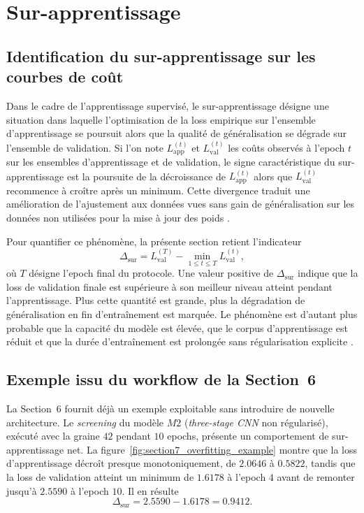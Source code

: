 \section{Sur-apprentissage}

\subsection{Identification du sur-apprentissage sur les courbes de co\^ut}
Dans le cadre de l'apprentissage supervis\'e, le sur-apprentissage d\'esigne une situation dans laquelle l'optimisation de la loss empirique sur l'ensemble d'apprentissage se poursuit alors que la qualit\'e de g\'en\'eralisation se d\'egrade sur l'ensemble de validation. Si l'on note $L_{\mathrm{app}}^{(t)}$ et $L_{\mathrm{val}}^{(t)}$ les co\^uts observ\'es \`a l'epoch $t$ sur les ensembles d'apprentissage et de validation, le signe caract\'eristique du sur-apprentissage est la poursuite de la d\'ecroissance de $L_{\mathrm{app}}^{(t)}$ alors que $L_{\mathrm{val}}^{(t)}$ recommence \`a cro\^itre apr\`es un minimum. Cette divergence traduit une am\'elioration de l'ajustement aux donn\'ees vues sans gain de g\'en\'eralisation sur les donn\'ees non utilis\'ees pour la mise \`a jour des poids \cite{manzanera_classification_apprentissage,poly_chap4_classifml}.

Pour quantifier ce ph\'enom\`ene, la pr\'esente section retient l'indicateur
\begin{equation}
\Delta_{\mathrm{sur}}
=
L_{\mathrm{val}}^{(T)}
-
\min_{1 \leq t \leq T} L_{\mathrm{val}}^{(t)},
\label{eq:section7_overfit_increase}
\end{equation}
o\`u $T$ d\'esigne l'epoch final du protocole. Une valeur positive de $\Delta_{\mathrm{sur}}$ indique que la loss de validation finale est sup\'erieure \`a son meilleur niveau atteint pendant l'apprentissage. Plus cette quantit\'e est grande, plus la d\'egradation de g\'en\'eralisation en fin d'entra\^inement est marqu\'ee. Le ph\'enom\`ene est d'autant plus probable que la capacit\'e du mod\`ele est \'elev\'ee, que le corpus d'apprentissage est r\'eduit et que la dur\'ee d'entra\^inement est prolong\'ee sans r\'egularisation explicite \cite{poly_chap4_classifml}.

\subsection{Exemple issu du workflow de la Section~6}
La Section~6 fournit d\'ej\`a un exemple exploitable sans introduire de nouvelle architecture. Le \textit{screening} du mod\`ele $M2$ (\textit{three-stage CNN} non r\'egularis\'e), ex\'ecut\'e avec la graine $42$ pendant $10$ epochs, pr\'esente un comportement de sur-apprentissage net. La figure~\ref{fig:section7_overfitting_example} montre que la loss d'apprentissage d\'ecro\^it presque monotoniquement, de $2.0646$ \`a $0.5822$, tandis que la loss de validation atteint un minimum de $1.6178$ \`a l'epoch $4$ avant de remonter jusqu'\`a $2.5590$ \`a l'epoch $10$. Il en r\'esulte
\begin{equation}
\Delta_{\mathrm{sur}} = 2.5590 - 1.6178 = 0.9412.
\end{equation}

